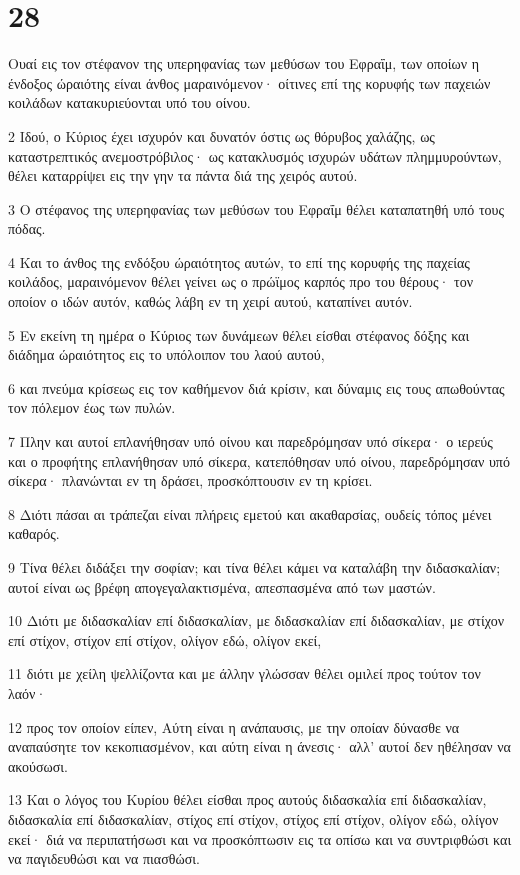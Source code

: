 \chapter{28}

\par Ουαί εις τον στέφανον της υπερηφανίας των μεθύσων του Εφραΐμ, των οποίων η ένδοξος ώραιότης είναι άνθος μαραινόμενον· οίτινες επί της κορυφής των παχειών κοιλάδων κατακυριεύονται υπό του οίνου.
\par 2 Ιδού, ο Κύριος έχει ισχυρόν και δυνατόν όστις ως θόρυβος χαλάζης, ως καταστρεπτικός ανεμοστρόβιλος· ως κατακλυσμός ισχυρών υδάτων πλημμυρούντων, θέλει καταρρίψει εις την γην τα πάντα διά της χειρός αυτού.
\par 3 Ο στέφανος της υπερηφανίας των μεθύσων του Εφραΐμ θέλει καταπατηθή υπό τους πόδας.
\par 4 Και το άνθος της ενδόξου ώραιότητος αυτών, το επί της κορυφής της παχείας κοιλάδος, μαραινόμενον θέλει γείνει ως ο πρώϊμος καρπός προ του θέρους· τον οποίον ο ιδών αυτόν, καθώς λάβη εν τη χειρί αυτού, καταπίνει αυτόν.
\par 5 Εν εκείνη τη ημέρα ο Κύριος των δυνάμεων θέλει είσθαι στέφανος δόξης και διάδημα ώραιότητος εις το υπόλοιπον του λαού αυτού,
\par 6 και πνεύμα κρίσεως εις τον καθήμενον διά κρίσιν, και δύναμις εις τους απωθούντας τον πόλεμον έως των πυλών.
\par 7 Πλην και αυτοί επλανήθησαν υπό οίνου και παρεδρόμησαν υπό σίκερα· ο ιερεύς και ο προφήτης επλανήθησαν υπό σίκερα, κατεπόθησαν υπό οίνου, παρεδρόμησαν υπό σίκερα· πλανώνται εν τη δράσει, προσκόπτουσιν εν τη κρίσει.
\par 8 Διότι πάσαι αι τράπεζαι είναι πλήρεις εμετού και ακαθαρσίας, ουδείς τόπος μένει καθαρός.
\par 9 Τίνα θέλει διδάξει την σοφίαν; και τίνα θέλει κάμει να καταλάβη την διδασκαλίαν; αυτοί είναι ως βρέφη απογεγαλακτισμένα, απεσπασμένα από των μαστών.
\par 10 Διότι με διδασκαλίαν επί διδασκαλίαν, με διδασκαλίαν επί διδασκαλίαν, με στίχον επί στίχον, στίχον επί στίχον, ολίγον εδώ, ολίγον εκεί,
\par 11 διότι με χείλη ψελλίζοντα και με άλλην γλώσσαν θέλει ομιλεί προς τούτον τον λαόν·
\par 12 προς τον οποίον είπεν, Αύτη είναι η ανάπαυσις, με την οποίαν δύνασθε να αναπαύσητε τον κεκοπιασμένον, και αύτη είναι η άνεσις· αλλ' αυτοί δεν ηθέλησαν να ακούσωσι.
\par 13 Και ο λόγος του Κυρίου θέλει είσθαι προς αυτούς διδασκαλία επί διδασκαλίαν, διδασκαλία επί διδασκαλίαν, στίχος επί στίχον, στίχος επί στίχον, ολίγον εδώ, ολίγον εκεί· διά να περιπατήσωσι και να προσκόπτωσιν εις τα οπίσω και να συντριφθώσι και να παγιδευθώσι και να πιασθώσι.

